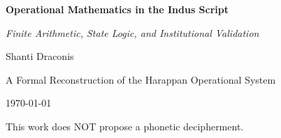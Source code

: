 \begin{titlepage}
    \centering
    \vspace*{2cm}
    
    {\Huge\bfseries Operational Mathematics in the Indus Script\par}
    \vspace{1.5cm}
    
    {\Large\itshape Finite Arithmetic, State Logic, and Institutional Validation\par}
    \vspace{2cm}
    
    {\Large Shanti Draconis\par}
    \vspace{1cm}
    
    \vfill
    
    {\large A Formal Reconstruction of the Harappan Operational System\par}
    \vspace{0.5cm}
    
    {\large \today\par}
    
    \vspace{1cm}
    
    {\small This work does NOT propose a phonetic decipherment.\par}
\end{titlepage}
